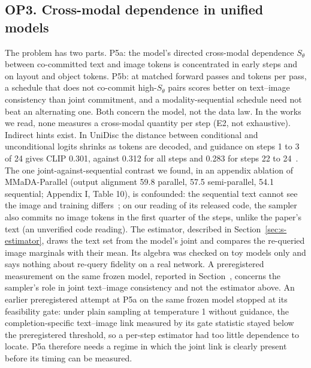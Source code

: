 \documentclass[acmsmall,screen]{acmart}
\makeatletter
\newcommand{\Mref}[1]{\@ifundefined{mr@#1}{\textbf{??}}{\csname mr@#1\endcsname}}
\makeatother
\begin{document}
\subsection{OP3. Cross-modal dependence in unified models}
\label{sec:s-open-op3}

The problem has two parts. P5a: the model's directed cross-modal dependence $S_\theta$ between co-committed text and image tokens is concentrated in early steps and on layout and object tokens. P5b: at matched forward passes and tokens per pass, a schedule that does not co-commit high-$S_\theta$ pairs scores better on text--image consistency than joint commitment, and a modality-sequential schedule need not beat an alternating one. Both concern the model, not the data law. %
In the works we read, none measures a cross-modal quantity per step (E2, not exhaustive). Indirect hints exist. In UniDisc the distance between conditional and unconditional logits shrinks as tokens are decoded, and guidance on steps 1 to 3 of 24 gives CLIP 0.301, against 0.312 for all steps and 0.283 for steps 22 to 24~\cite{arXiv:2503.20853}. The one joint-against-sequential contrast we found, in an appendix ablation of MMaDA-Parallel (output alignment 59.8 parallel, 57.5 semi-parallel, 54.1 sequential; Appendix I, Table 10), is confounded: the sequential text cannot see the image and training differs~\cite{arXiv:2511.09611}; on our reading of its released code, the sampler also commits no image tokens in the first quarter of the steps, unlike the paper's text (an unverified code reading). %
The estimator, described in Section~\ref{sec:s-estimator}, draws the text set from the model's joint and compares the re-queried image marginals with their mean. Its algebra was checked on toy models only and says nothing about re-query fidelity on a real network.
A preregistered measurement on the same frozen model, reported in Section~\Mref{sec:exp003}, concerns the sampler's role in joint text--image consistency and not the estimator above. %
An earlier preregistered attempt at P5a on the same frozen model stopped at its feasibility gate: under plain sampling at temperature 1 without guidance, the completion-specific text--image link measured by its gate statistic stayed below the preregistered threshold, so a per-step estimator had too little dependence to locate. P5a therefore needs a regime in which the joint link is clearly present before its timing can be measured. %
\end{document}
